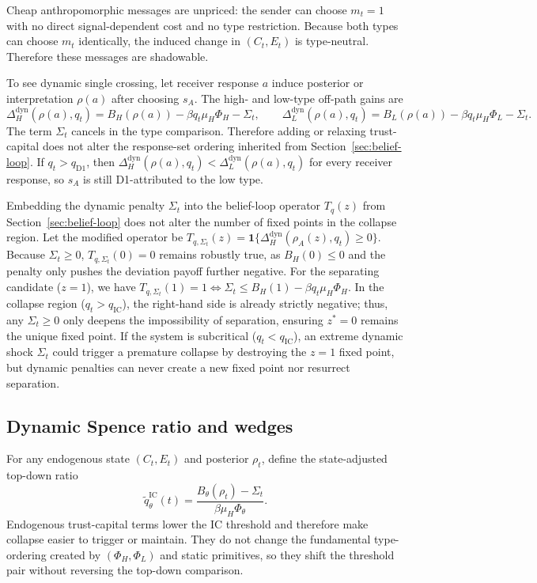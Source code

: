 Cheap anthropomorphic messages are unpriced: the sender can choose $m_t=1$ with no direct signal-dependent cost and no type restriction. Because both types can choose $m_t$ identically, the induced change in $(C_t,E_t)$ is type-neutral. Therefore these messages are shadowable.

To see dynamic single crossing, let receiver response $a$ induce posterior or interpretation $\rho(a)$ after choosing $s_A$. The high- and low-type off-path gains are
\[
\Delta_H^{\mathrm{dyn}}(\rho(a),q_t)
=B_H(\rho(a))-\beta q_t\mu_H\Phi_H-\Sigma_t,
\qquad
\Delta_L^{\mathrm{dyn}}(\rho(a),q_t)
=B_L(\rho(a))-\beta q_t\mu_H\Phi_L-\Sigma_t.
\]
The term $\Sigma_t$ cancels in the type comparison. Therefore adding or relaxing trust-capital does not alter the response-set ordering inherited from Section~\ref{sec:belief-loop}. If $q_t>q_{\mathrm{D1}}$, then $\Delta_H^{\mathrm{dyn}}(\rho(a),q_t)<\Delta_L^{\mathrm{dyn}}(\rho(a),q_t)$ for every receiver response, so $s_A$ is still D1-attributed to the low type.

\begin{remark}
Embedding the dynamic penalty $\Sigma_t$ into the belief-loop operator $T_q(z)$ from Section~\ref{sec:belief-loop} does not alter the number of fixed points in the collapse region. Let the modified operator be $T_{q,\Sigma_t}(z) = \mathbf{1}\{\Delta_H^{\mathrm{dyn}}(\rho_A(z),q_t) \ge 0\}$. Because $\Sigma_t \ge 0$, $T_{q,\Sigma_t}(0) = 0$ remains robustly true, as $B_H(0) \le 0$ and the penalty only pushes the deviation payoff further negative. For the separating candidate ($z=1$), we have $T_{q,\Sigma_t}(1) = 1 \iff \Sigma_t \le B_H(1) - \beta q_t \mu_H \Phi_H$. In the collapse region ($q_t > q_{\mathrm{IC}}$), the right-hand side is already strictly negative; thus, any $\Sigma_t \ge 0$ only deepens the impossibility of separation, ensuring $z^*=0$ remains the unique fixed point. If the system is subcritical ($q_t < q_{\mathrm{IC}}$), an extreme dynamic shock $\Sigma_t$ could trigger a premature collapse by destroying the $z=1$ fixed point, but dynamic penalties can never create a new fixed point nor resurrect separation.
\end{remark}

\subsection{Dynamic Spence ratio and wedges}

For any endogenous state $(C_t,E_t)$ and posterior $\rho_t$, define the state-adjusted top-down ratio
\[
\widetilde q^{\mathrm{IC}}_\theta(t)=\frac{B_\theta(\rho_t)-\Sigma_t}{\beta\mu_H\Phi_\theta}.
\]
Endogenous trust-capital terms lower the IC threshold and therefore make collapse easier to trigger or maintain. They do not change the fundamental type-ordering created by $(\Phi_H,\Phi_L)$ and static primitives, so they shift the threshold pair without reversing the top-down comparison.

